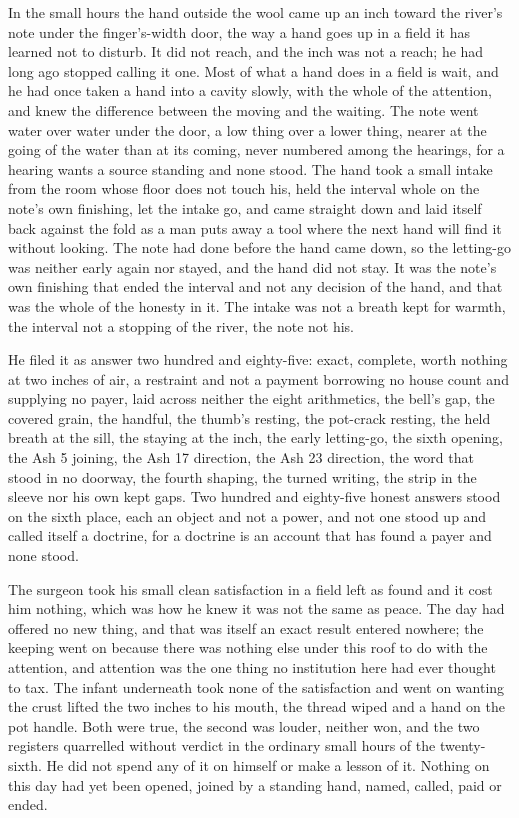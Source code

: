 In the small hours the hand outside the wool came up an inch toward the river's note under the finger's-width door, the way a hand goes up in a field it has learned not to disturb. It did not reach, and the inch was not a reach; he had long ago stopped calling it one. Most of what a hand does in a field is wait, and he had once taken a hand into a cavity slowly, with the whole of the attention, and knew the difference between the moving and the waiting. The note went water over water under the door, a low thing over a lower thing, nearer at the going of the water than at its coming, never numbered among the hearings, for a hearing wants a source standing and none stood. The hand took a small intake from the room whose floor does not touch his, held the interval whole on the note's own finishing, let the intake go, and came straight down and laid itself back against the fold as a man puts away a tool where the next hand will find it without looking. The note had done before the hand came down, so the letting-go was neither early again nor stayed, and the hand did not stay. It was the note's own finishing that ended the interval and not any decision of the hand, and that was the whole of the honesty in it. The intake was not a breath kept for warmth, the interval not a stopping of the river, the note not his.

He filed it as answer two hundred and eighty-five: exact, complete, worth nothing at two inches of air, a restraint and not a payment borrowing no house count and supplying no payer, laid across neither the eight arithmetics, the bell's gap, the covered grain, the handful, the thumb's resting, the pot-crack resting, the held breath at the sill, the staying at the inch, the early letting-go, the sixth opening, the Ash 5 joining, the Ash 17 direction, the Ash 23 direction, the word that stood in no doorway, the fourth shaping, the turned writing, the strip in the sleeve nor his own kept gaps. Two hundred and eighty-five honest answers stood on the sixth place, each an object and not a power, and not one stood up and called itself a doctrine, for a doctrine is an account that has found a payer and none stood.

The surgeon took his small clean satisfaction in a field left as found and it cost him nothing, which was how he knew it was not the same as peace. The day had offered no new thing, and that was itself an exact result entered nowhere; the keeping went on because there was nothing else under this roof to do with the attention, and attention was the one thing no institution here had ever thought to tax. The infant underneath took none of the satisfaction and went on wanting the crust lifted the two inches to his mouth, the thread wiped and a hand on the pot handle. Both were true, the second was louder, neither won, and the two registers quarrelled without verdict in the ordinary small hours of the twenty-sixth. He did not spend any of it on himself or make a lesson of it. Nothing on this day had yet been opened, joined by a standing hand, named, called, paid or ended.

